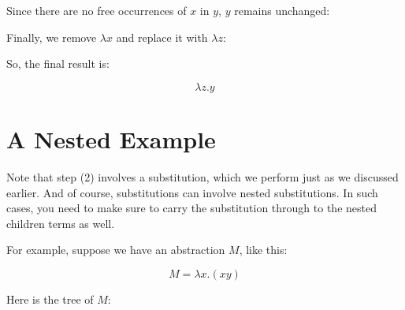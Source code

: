 \documentclass{book}
\numberwithin{equation}{chapter}
\begin{document}
\noindent
Since there are no free occurrences of $x$ in $y$, $y$ remains unchanged:

\begin{center}
\end{center}

\noindent
Finally, we remove $\lambda x$ and replace it with $\lambda z$:

\begin{center}
\end{center}

\noindent
So, the final result is:

\begin{equation}
\lambda z.y
\end{equation}


\section{A Nested Example}

Note that step (2) involves a substitution, which we perform just as we discussed earlier. And of course, substitutions can involve nested substitutions. In such cases, you need to make sure to carry the substitution through to the nested children terms as well.

For example, suppose we have an abstraction $M$, like this:

\begin{equation}
M = \lambda x.(x y)
\end{equation}

\noindent
Here is the tree of $M$:

\begin{center}
\end{center}
\end{document}
